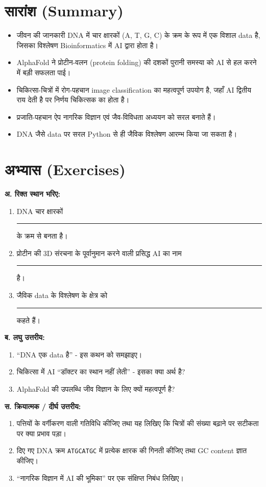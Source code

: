 \section*{सारांश (Summary)}
\begin{itemize}[leftmargin=1.4em]
  \item जीवन की जानकारी DNA में चार क्षारकों (A, T, G, C) के क्रम के रूप में एक विशाल
        data है, जिसका विश्लेषण Bioinformatics में AI द्वारा होता है।
  \item AlphaFold ने प्रोटीन-वलन (protein folding) की दशकों पुरानी समस्या को AI से
        हल करने में बड़ी सफलता पाई।
  \item चिकित्सा-चित्रों में रोग-पहचान image classification का महत्वपूर्ण उपयोग है,
        जहाँ AI द्वितीय राय देती है पर निर्णय चिकित्सक का होता है।
  \item प्रजाति-पहचान ऐप नागरिक विज्ञान एवं जैव-विविधता अध्ययन को सरल बनाते हैं।
  \item DNA जैसे data पर सरल Python से ही जैविक विश्लेषण आरम्भ किया जा सकता है।
\end{itemize}

\section*{अभ्यास (Exercises)}
\textbf{अ. रिक्त स्थान भरिए:}
\begin{enumerate}[leftmargin=1.6em]
  \item DNA चार क्षारकों \rule{2.8cm}{0.4pt} के क्रम से बनता है।
  \item प्रोटीन की 3D संरचना के पूर्वानुमान करने वाली प्रसिद्ध AI का नाम
        \rule{2.8cm}{0.4pt} है।
  \item जैविक data के विश्लेषण के क्षेत्र को \rule{2.8cm}{0.4pt} कहते हैं।
\end{enumerate}

\textbf{ब. लघु उत्तरीय:}
\begin{enumerate}[leftmargin=1.6em]
  \item “DNA एक data है” - इस कथन को समझाइए।
  \item चिकित्सा में AI “डॉक्टर का स्थान नहीं लेती” - इसका क्या अर्थ है?
  \item AlphaFold की उपलब्धि जीव विज्ञान के लिए क्यों महत्वपूर्ण है?
\end{enumerate}

\textbf{स. क्रियात्मक / दीर्घ उत्तरीय:}
\begin{enumerate}[leftmargin=1.6em]
  \item पत्तियों के वर्गीकरण वाली गतिविधि कीजिए तथा यह लिखिए कि चित्रों की संख्या
        बढ़ाने पर सटीकता पर क्या प्रभाव पड़ा।
  \item दिए गए DNA क्रम \texttt{ATGCATGC} में प्रत्येक क्षारक की गिनती कीजिए तथा
        GC content ज्ञात कीजिए।
  \item “नागरिक विज्ञान में AI की भूमिका” पर एक संक्षिप्त निबंध लिखिए।
\end{enumerate}

